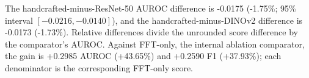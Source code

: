 The handcrafted-minus-ResNet-50 AUROC difference is -0.0175 (-1.75\%; 95\% interval $[-0.0216,-0.0140]$), and the handcrafted-minus-DINOv2 difference is -0.0173 (-1.73\%). Relative differences divide the unrounded score difference by the comparator's AUROC. Against FFT-only, the internal ablation comparator, the gain is +0.2985 AUROC (+43.65\%) and +0.2590 F1 (+37.93\%); each denominator is the corresponding FFT-only score.
